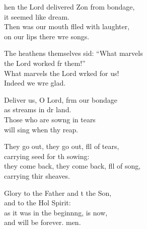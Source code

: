 \settowidth{\versewidth}{they come back, they come back, full of song, *}
\begin{psalmverse}%
  \begin{patverse}
hen the Lord delivered Z\pointup{\i}on from bondage,\Med\\
it seemed like  dream.\\
Then was our mouth f\pointup{\i}lled with laughter,\Med\\
on our lips there wre songs.

The heathens themselves sid: “What marvels\Med\\
the Lord worked fr them!”\\
What marvels the Lord wrked for us!\Med\\
Indeed we wre glad.

Deliver us, O Lord, frm our bondage\Med\\
as streams in dr land.\\
Those who are sow\pointup{\i}ng in tears\Med\\
will sing when thy reap.

They go out, they go out, fll of tears,\Med\\
carrying seed for th sowing:\\
they come back, they come back, fll of song,\Med\\
carrying thir sheaves.

Glory to the Father and t the Son,\Med\\
and to the Hol Spirit:\\
as it was in the beginn\pointup{\i}ng, is now,\Med\\
and will be forever. men. 
  \end{patverse}
\end{psalmverse}

